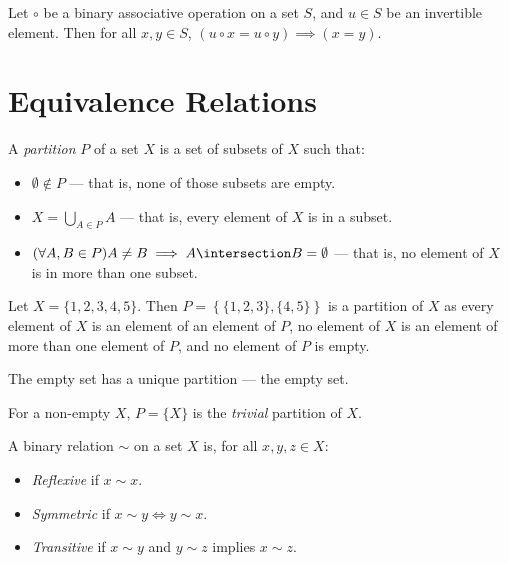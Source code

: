\documentclass[12pt]{article}
\begin{document}
\begin{cor}
    Let $\circ$ be a binary associative operation on a set $S$, and $u \in S$ be an invertible element. Then for all $x, y \in S$, $(u \circ x = u \circ y) \implies (x = y)$.
\end{cor}

\section{Equivalence Relations}

\begin{defn}
    A \emph{partition} $P$ of a set $X$ is a set of subsets of $X$ such that:
    \begin{itemize}
        \item $\emptyset \notin P$ --- that is, none of those subsets are empty.
        \item $X = \bigcup_{A\in P}A$ --- that is, every element of $X$ is in a subset.
        \item $(\forall A, B \in P) A \neq B \implies A \intersection B = \emptyset$ --- that is, no element of $X$ is in more than one subset.
    \end{itemize}
\end{defn}

\begin{exmp}
    Let $X = \{1, 2, 3, 4, 5\}$. Then $P = \left\{\{1, 2, 3\}, \{4, 5\}\right\}$ is a partition of $X$ as every element of $X$ is an element of an element of $P$, no element of $X$ is an element of more than one element of $P$, and no element of $P$ is empty.
\end{exmp}

\begin{exmp}
    The empty set has a unique partition --- the empty set.
\end{exmp}

\begin{defn}
    For a non-empty $X$, $P = \{X\}$ is the \emph{trivial} partition of $X$.
\end{defn}

\begin{defn}
    A binary relation $\sim$ on a set $X$ is, for all $x, y, z \in X$:
    \begin{itemize}
        \item \emph{Reflexive} if $x \sim x$.
        \item \emph{Symmetric} if $x \sim y \iff y \sim x$.
        \item \emph{Transitive} if $x \sim y$ and $y \sim z$ implies $x \sim z$.
    \end{itemize}
\end{defn}
\end{document}
